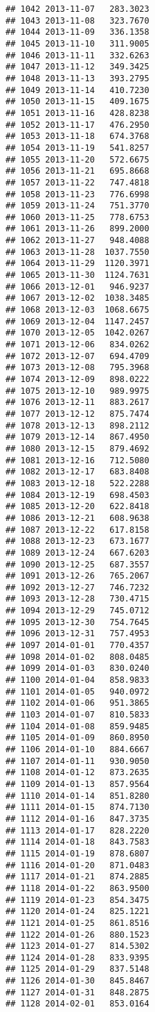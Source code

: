 \documentclass[
]{article}
\begin{document}
\begin{verbatim}
## 1042 2013-11-07   283.3023
## 1043 2013-11-08   323.7670
## 1044 2013-11-09   336.1358
## 1045 2013-11-10   311.9005
## 1046 2013-11-11   332.6263
## 1047 2013-11-12   349.3425
## 1048 2013-11-13   393.2795
## 1049 2013-11-14   410.7230
## 1050 2013-11-15   409.1675
## 1051 2013-11-16   428.8238
## 1052 2013-11-17   476.2950
## 1053 2013-11-18   674.3768
## 1054 2013-11-19   541.8257
## 1055 2013-11-20   572.6675
## 1056 2013-11-21   695.8668
## 1057 2013-11-22   747.4818
## 1058 2013-11-23   776.6998
## 1059 2013-11-24   751.3770
## 1060 2013-11-25   778.6753
## 1061 2013-11-26   899.2000
## 1062 2013-11-27   948.4088
## 1063 2013-11-28  1037.7550
## 1064 2013-11-29  1120.3971
## 1065 2013-11-30  1124.7631
## 1066 2013-12-01   946.9237
## 1067 2013-12-02  1038.3485
## 1068 2013-12-03  1068.6675
## 1069 2013-12-04  1147.2457
## 1070 2013-12-05  1042.0267
## 1071 2013-12-06   834.0262
## 1072 2013-12-07   694.4709
## 1073 2013-12-08   795.3968
## 1074 2013-12-09   898.0222
## 1075 2013-12-10   989.9975
## 1076 2013-12-11   883.2617
## 1077 2013-12-12   875.7474
## 1078 2013-12-13   898.2112
## 1079 2013-12-14   867.4950
## 1080 2013-12-15   879.4692
## 1081 2013-12-16   712.5080
## 1082 2013-12-17   683.8408
## 1083 2013-12-18   522.2288
## 1084 2013-12-19   698.4503
## 1085 2013-12-20   622.8418
## 1086 2013-12-21   608.9638
## 1087 2013-12-22   617.8158
## 1088 2013-12-23   673.1677
## 1089 2013-12-24   667.6203
## 1090 2013-12-25   687.3557
## 1091 2013-12-26   765.2067
## 1092 2013-12-27   746.7232
## 1093 2013-12-28   730.4715
## 1094 2013-12-29   745.0712
## 1095 2013-12-30   754.7645
## 1096 2013-12-31   757.4953
## 1097 2014-01-01   770.4357
## 1098 2014-01-02   808.0485
## 1099 2014-01-03   830.0240
## 1100 2014-01-04   858.9833
## 1101 2014-01-05   940.0972
## 1102 2014-01-06   951.3865
## 1103 2014-01-07   810.5833
## 1104 2014-01-08   859.9485
## 1105 2014-01-09   860.8950
## 1106 2014-01-10   884.6667
## 1107 2014-01-11   930.9050
## 1108 2014-01-12   873.2635
## 1109 2014-01-13   857.9564
## 1110 2014-01-14   851.8280
## 1111 2014-01-15   874.7130
## 1112 2014-01-16   847.3735
## 1113 2014-01-17   828.2220
## 1114 2014-01-18   843.7583
## 1115 2014-01-19   878.6807
## 1116 2014-01-20   871.0483
## 1117 2014-01-21   874.2885
## 1118 2014-01-22   863.9500
## 1119 2014-01-23   854.3475
## 1120 2014-01-24   825.1221
## 1121 2014-01-25   861.8516
## 1122 2014-01-26   880.1523
## 1123 2014-01-27   814.5302
## 1124 2014-01-28   833.9395
## 1125 2014-01-29   837.5148
## 1126 2014-01-30   845.8467
## 1127 2014-01-31   848.2875
## 1128 2014-02-01   853.0164

\end{verbatim}
\end{document}

